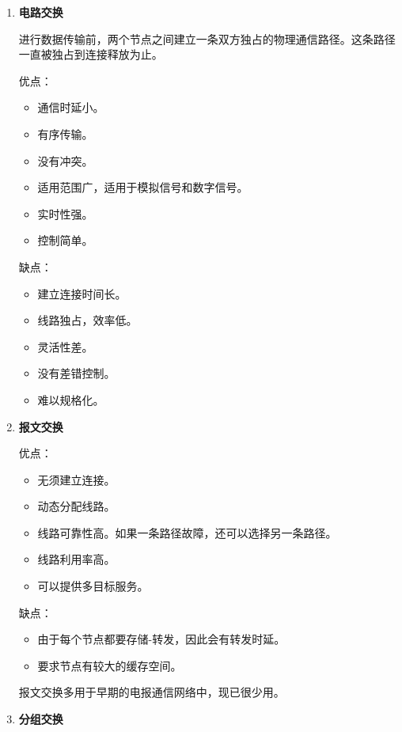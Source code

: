 \documentclass[12pt, a4paper, oneside]{ctexart}
\begin{document}
\begin{enumerate}
    \item {\bf 电路交换}
    
    进行数据传输前，两个节点之间建立一条双方独占的物理通信路径。这条路径一直被独占到连接释放为止。

    优点：
    \begin{itemize}
        \item 通信时延小。
        \item 有序传输。
        \item 没有冲突。
        \item 适用范围广，适用于模拟信号和数字信号。
        \item 实时性强。
        \item 控制简单。
    \end{itemize}
    缺点：
    \begin{itemize}
        \item 建立连接时间长。
        \item 线路独占，效率低。
        \item 灵活性差。
        \item 没有差错控制。
        \item 难以规格化。
    \end{itemize}
    \item {\bf 报文交换}
    
    优点：
    \begin{itemize}
        \item 无须建立连接。
        \item 动态分配线路。
        \item 线路可靠性高。如果一条路径故障，还可以选择另一条路径。
        \item 线路利用率高。
        \item 可以提供多目标服务。
    \end{itemize}
    缺点：
    \begin{itemize}
        \item 由于每个节点都要存储-转发，因此会有转发时延。
        \item 要求节点有较大的缓存空间。
    \end{itemize}
    报文交换多用于早期的电报通信网络中，现已很少用。
    \item {\bf 分组交换}
    

\end{enumerate}
\end{document}
